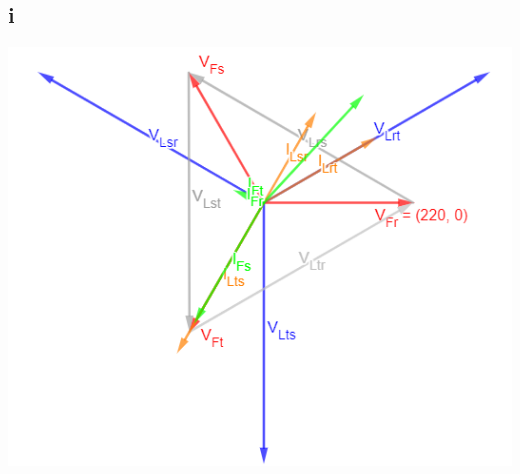 \documentclass{article}
\begin{document}
\subsection{i}
\includegraphics[scale=0.7]{fasores_3.png}
\end{document}
